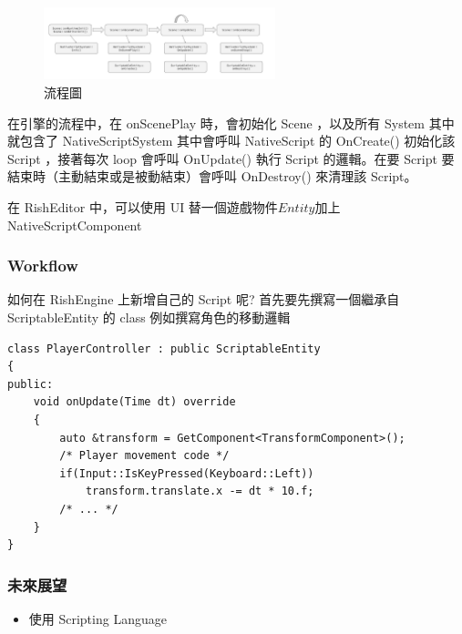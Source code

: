 \begin{figure}[h]
    \begin{center}
    \includegraphics[width=0.6\textwidth]{./resources/scriptable/process.png}
    \end{center}
\caption{流程圖}
\label{fig:process}
\end{figure}

在引擎的流程中，在 onScenePlay\(\) 時，會初始化 Scene ，以及所有 System 其中就包含了 NativeScriptSystem 其中會呼叫 NativeScript 的 OnCreate() 初始化該 Script ，接著每次 loop 會呼叫 OnUpdate() 執行 Script 的邏輯。在要 Script 要結束時（主動結束或是被動結束）會呼叫 OnDestroy() 來清理該 Script。

在 RishEditor 中，可以使用 UI 替一個遊戲物件\(Entity\)加上 NativeScriptComponent

\subsubsection{Workflow}

如何在 RishEngine 上新增自己的 Script 呢? 首先要先撰寫一個繼承自 ScriptableEntity 的 class 例如撰寫角色的移動邏輯

\begin{lstlisting}
class PlayerController : public ScriptableEntity
{
public:
    void onUpdate(Time dt) override
    {
        auto &transform = GetComponent<TransformComponent>();
        /* Player movement code */
        if(Input::IsKeyPressed(Keyboard::Left))
            transform.translate.x -= dt * 10.f;
        /* ... */
    }
}
\end{lstlisting}

\subsubsection{未來展望}

\begin{itemize}
\item{使用 Scripting Language}
\end{itemize}


\newpage
